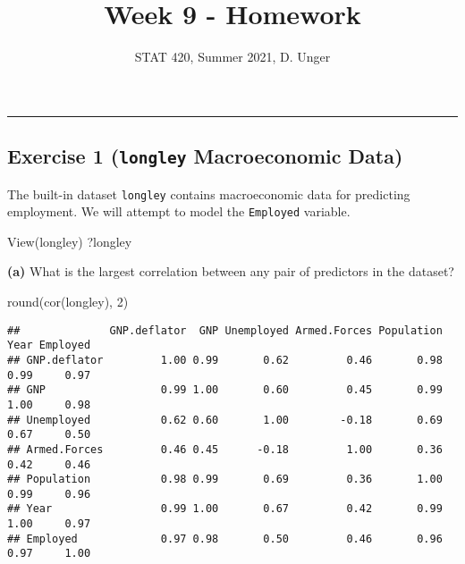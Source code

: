 \documentclass[
]{article}
\title{Week 9 - Homework}
\author{STAT 420, Summer 2021, D. Unger}
\date{}
\newenvironment{Shaded}{\begin{snugshade}}{\end{snugshade}}
\newcommand{\DecValTok}[1]{\textcolor[rgb]{0.00,0.00,0.81}{#1}}
\newcommand{\FunctionTok}[1]{\textcolor[rgb]{0.00,0.00,0.00}{#1}}
\newcommand{\NormalTok}[1]{#1}
\begin{document}
\maketitle

\begin{center}\rule{0.5\linewidth}{0.5pt}\end{center}

\hypertarget{exercise-1-longley-macroeconomic-data}{%
\subsection{\texorpdfstring{Exercise 1 (\texttt{longley} Macroeconomic
Data)}{Exercise 1 (longley Macroeconomic Data)}}\label{exercise-1-longley-macroeconomic-data}}

The built-in dataset \texttt{longley} contains macroeconomic data for
predicting employment. We will attempt to model the \texttt{Employed}
variable.

\begin{Shaded}
\begin{Highlighting}[]
\FunctionTok{View}\NormalTok{(longley)}
\NormalTok{?longley}
\end{Highlighting}
\end{Shaded}

\textbf{(a)} What is the largest correlation between any pair of
predictors in the dataset?

\begin{Shaded}
\begin{Highlighting}[]
\FunctionTok{round}\NormalTok{(}\FunctionTok{cor}\NormalTok{(longley), }\DecValTok{2}\NormalTok{)}
\end{Highlighting}
\end{Shaded}

\begin{verbatim}
##              GNP.deflator  GNP Unemployed Armed.Forces Population Year Employed
## GNP.deflator         1.00 0.99       0.62         0.46       0.98 0.99     0.97
## GNP                  0.99 1.00       0.60         0.45       0.99 1.00     0.98
## Unemployed           0.62 0.60       1.00        -0.18       0.69 0.67     0.50
## Armed.Forces         0.46 0.45      -0.18         1.00       0.36 0.42     0.46
## Population           0.98 0.99       0.69         0.36       1.00 0.99     0.96
## Year                 0.99 1.00       0.67         0.42       0.99 1.00     0.97
## Employed             0.97 0.98       0.50         0.46       0.96 0.97     1.00
\end{verbatim}
\end{document}
